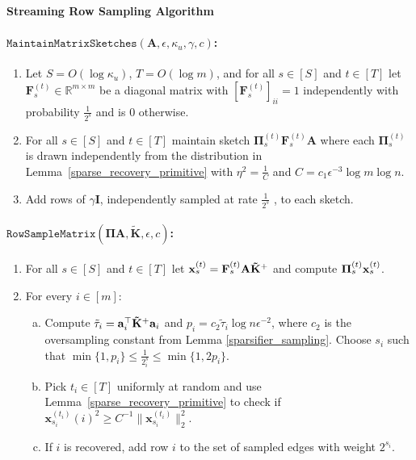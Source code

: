 \documentclass[11pt]{article}
\newcommand{\norm}[1]{\|#1\|}
\newcommand{\bv}[1]{\mathbf{#1}}
\newcommand{\maintainma}{\texttt{MaintainMatrixSketches}}
\newcommand{\sample}{\texttt{RowSampleMatrix}}
\newcommand{\R}{\mathbb{R}}
\newcommand{\mvar}[1]{\bv{#1}}
\newcommand{\ma}{\mvar{A}}
\newcommand{\mk}{\mvar{K}}
\begin{document}
\begin{framed}{\noindent\bfseries Streaming Row Sampling Algorithm} 

\paragraph{$\maintainma(\bv{A}, \epsilon, \kappa_u, \gamma,c)$:}
\begin{enumerate}

\item Let $S = O(\log \kappa_u)$, $T = O(\log m)$, and for all $s \in [S]$ and $t \in [T]$ let $\bv{F}_s^{(t)} \in \R^{m \times m}$ be a diagonal matrix with $[\bv{F}_s^{(t)}]_{ii} = 1$ independently with probability $\frac{1}{2^s}$ and is $0$ otherwise.\footnotemark
\item For all $s \in [S]$ and $t \in [T]$ maintain sketch $\bv{\Pi}_s^{(t)} \bv{F}_s^{(t)} \bv{A}$ where each $\bv{\Pi}_s^{(t)}$ is drawn independently from the distribution in Lemma~\ref{sparse_recovery_primitive} with $\eta^2 = \frac{1}{C}$ and $C = c_1 \epsilon^{-3} \log m \log n$.
\item Add rows of $\gamma \bv{I}$, independently sampled at rate $\frac{1}{2^s}$ , to each sketch.

\end{enumerate}

\paragraph{$\sample(\bv{\Pi} \ma, \tilde{\mk}, \epsilon,c)$:}
\begin{enumerate}
\item For all $s \in [S]$ and $t \in [T]$ let $\vxst = \bv{F}_s^{(t)} \bv{A} \bv{\tilde K}^+$ and compute $\bv{\Pi}_s^{(t)} \vxst$.

\item For every $i \in [m]$:
\begin{enumerate}[(a)]
\item Compute $\strlev_i = \bv{a}_i^\top \bv{\tilde K}^+ \bv{a}_i$ and $p_i =  c_2\tilde \tau_i \log n \epsilon^{-2}$, where $c_2$ is the oversampling constant from Lemma \ref{sparsifier_sampling}. Choose $s_i$ such that $ \min \{1, p_i \} \le \frac{1}{2^s_i} \le \min \{1, 2p_i \}$.

\item Pick $t_i \in [T]$ uniformly at random and use Lemma~\ref{sparse_recovery_primitive} to check if $\bv{x}_{s_i}^{(t_i)}(i)^2 \geq C^{-1}\norm{\bv{x}_{s_i}^{(t_i)}}_2^2$.

\item If $i$ is recovered, add row $i$ to the set of sampled edges with weight $2^{s_i}$.
\end{enumerate}

\end{enumerate}

\end{framed}
\end{document}
